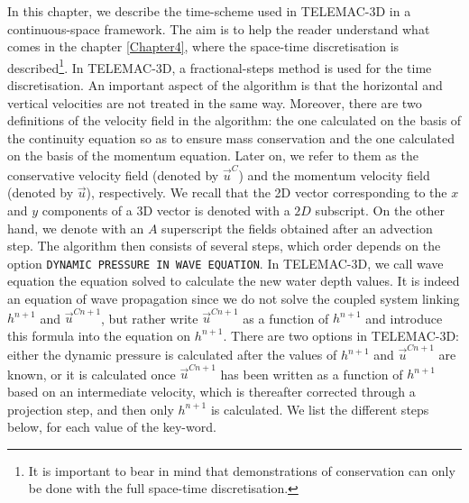 In this chapter, we describe the time-scheme used in TELEMAC-3D in 
a continuous-space framework. The aim is to help the reader understand
what comes in the chapter \ref{Chapter4}, where the space-time discretisation
is described\footnote{It is important to bear in mind that demonstrations 
of conservation can only be done with the full space-time discretisation.}.
In TELEMAC-3D, a fractional-steps method is used for the time discretisation.
An important aspect of the algorithm is that the horizontal and vertical velocities are
not treated in the same way. Moreover, there are two definitions of the velocity field
in the algorithm: the one calculated on the basis of the continuity equation so as to ensure
mass conservation and the one calculated on the basis of the momentum equation. Later on,
we refer to them as the conservative velocity field (denoted by $\vec{u}^C$) and the momentum
velocity field (denoted by $\vec{u}$), respectively. 
We recall that the 2D vector corresponding to the $x$ and $y$
components of a 3D vector is denoted with a $2D$ subscript. 
On the other hand, we denote with an $A$ superscript the fields obtained after an advection step.
The algorithm then consists of several steps, which order depends on the
option \texttt{DYNAMIC PRESSURE IN WAVE EQUATION}. 
In TELEMAC-3D, we call wave equation the equation solved to calculate
the new water depth values. It is indeed an equation of wave propagation
since we do not solve the coupled system linking $h^{n+1}$ and $\vec{u}^{Cn+1}$,
but rather write $\vec{u}^{Cn+1}$ as a function of $h^{n+1}$ and introduce
this formula into the equation on $h^{n+1}$. There are two options in TELEMAC-3D:
either the dynamic pressure is calculated after the values of $h^{n+1}$ and
$\vec{u}^{Cn+1}$ are known, or it is calculated once $\vec{u}^{Cn+1}$ has been written 
as a function of $h^{n+1}$ based on an intermediate velocity, which is
thereafter corrected through a projection step, and then only $h^{n+1}$ is
calculated. We list the different steps below, for each value of the key-word.

